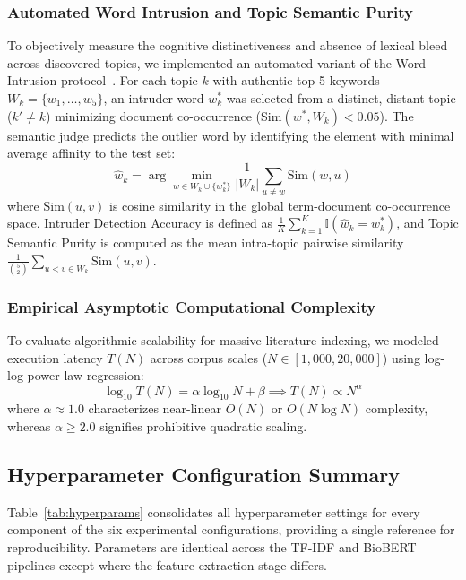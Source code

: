 \documentclass[a4paper,10pt,conference]{IEEEtran}
\begin{document}
\subsubsection{Automated Word Intrusion and Topic Semantic Purity}

To objectively measure the cognitive distinctiveness and absence of lexical bleed across discovered topics, we implemented an automated variant of the Word Intrusion protocol~\cite{ref29}. For each topic $k$ with authentic top-5 keywords $W_k = \{w_1, \dots, w_5\}$, an intruder word $w_k^*$ was selected from a distinct, distant topic ($k' \ne k$) minimizing document co-occurrence ($\text{Sim}(w^*, W_k) < 0.05$). The semantic judge predicts the outlier word by identifying the element with minimal average affinity to the test set:
\begin{equation}
\hat{w}_k = \arg\min_{w \in W_k \cup \{w_k^*\}} \frac{1}{|W_k|} \sum_{u \ne w} \text{Sim}(w, u)
\end{equation}
where $\text{Sim}(u, v)$ is cosine similarity in the global term-document co-occurrence space. Intruder Detection Accuracy is defined as $\frac{1}{K} \sum_{k=1}^K \mathbb{I}(\hat{w}_k = w_k^*)$, and Topic Semantic Purity is computed as the mean intra-topic pairwise similarity $\frac{1}{\binom{5}{2}} \sum_{u < v \in W_k} \text{Sim}(u, v)$.

\subsubsection{Empirical Asymptotic Computational Complexity}

To evaluate algorithmic scalability for massive literature indexing, we modeled execution latency $T(N)$ across corpus scales ($N \in [1{,}000, 20{,}000]$) using log-log power-law regression:
\begin{equation}
\log_{10} T(N) = \alpha \log_{10} N + \beta \implies T(N) \propto N^\alpha
\end{equation}
where $\alpha \approx 1.0$ characterizes near-linear $O(N)$ or $O(N \log N)$ complexity, whereas $\alpha \ge 2.0$ signifies prohibitive quadratic scaling.

\subsection{Hyperparameter Configuration Summary}

Table~\ref{tab:hyperparams} consolidates all hyperparameter settings for every component of the six experimental configurations, providing a single reference for reproducibility. Parameters are identical across the TF-IDF and BioBERT pipelines except where the feature extraction stage differs.
\end{document}
